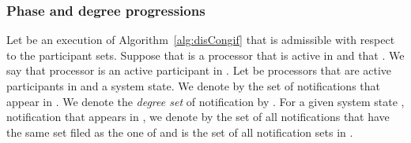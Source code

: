 \documentclass[11pt]{article}
\begin{document}
\subsubsection*{Phase and degree progressions}
Let  be an execution of Algorithm~\ref{alg:disCongif} that is admissible with respect to the participant sets. Suppose that  is a processor that is active in  and that . We say that processor  is an active participant in .
Let  be processors that are active participants in  and  a system state. 
We denote by  the set of notifications that appear in .
We denote the \emph{degree set} of notification  by . For a given system state , notification  that appears in , we denote by  the set of all notifications  that have the same set filed as the one of  and  is the set of all notification sets in .
\end{document}
